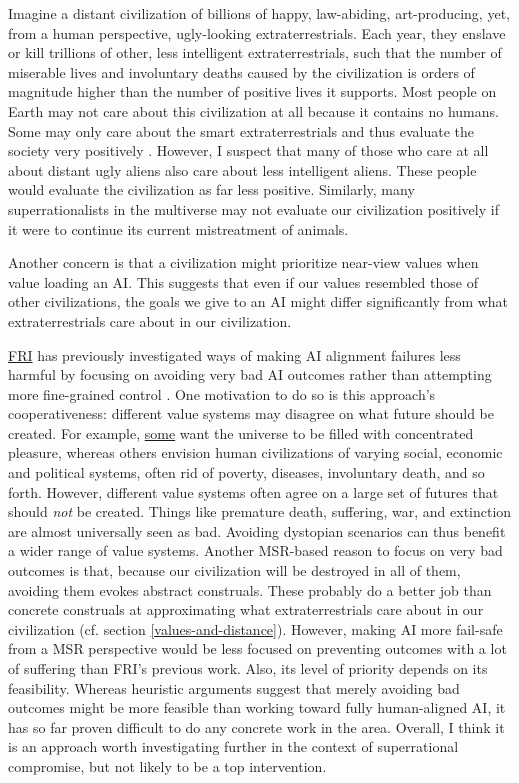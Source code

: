 Imagine a distant civilization of billions of happy, law-abiding,
art-producing, yet, from a human perspective, ugly-looking
extraterrestrials. Each year, they enslave or kill trillions of other,
less intelligent extraterrestrials, such that the number of miserable
lives and involuntary deaths caused by the civilization is orders of
magnitude higher than the number of positive lives it supports. Most
people on Earth may not care about this civilization at all because it
contains no humans. Some may only care about the smart extraterrestrials
and thus evaluate the society very positively
\parencite{Kagan2016-gc}. However, I suspect that many of
those who care at all about distant ugly aliens also care about less
intelligent aliens. These people would evaluate the civilization as far
less positive. Similarly, many superrationalists in the multiverse may
not evaluate our civilization positively if it were to continue its
current mistreatment of animals.

Another concern is that a civilization might prioritize near-view values
when value loading an AI. This suggests that even if our values
resembled those of other civilizations, the goals we give to an AI might
differ significantly from what extraterrestrials care about in our
civilization.

\href{https://foundational-research.org}{FRI} has previously investigated ways of making AI
alignment failures less harmful by focusing on avoiding very bad AI outcomes rather than
attempting more fine-grained control
\parencite{Gloor2016-oy}. One motivation to do so is this
approach's cooperativeness: different value systems may disagree on what
future should be created. For example,
\href{https://www.hedweb.com/hedab.htm}{some} want the universe
to be filled with concentrated pleasure, whereas others envision human
civilizations of varying social, economic and political systems, often
rid of poverty, diseases, involuntary death, and so forth. However,
different value systems often agree on a large set of futures that
should \emph{not} be created. Things like premature death, suffering,
war, and extinction are almost universally seen as bad. Avoiding
dystopian scenarios can thus benefit a wider range of value systems.
Another MSR-based reason to focus on very bad outcomes is that, because
our civilization will be destroyed in all of them, avoiding them evokes
abstract construals. These probably do a better job than concrete
construals at approximating what extraterrestrials care about in our
civilization (cf. section
\ref{values-and-distance}). However, making AI more fail-safe from a MSR perspective
would be less focused on preventing outcomes with a lot of suffering
than FRI's previous work. Also, its level of priority depends on its
feasibility. Whereas heuristic arguments suggest that merely avoiding
bad outcomes might be more feasible than working toward fully
human-aligned AI, it has so far proven difficult to do any concrete work
in the area. Overall, I think it is an approach worth investigating
further in the context of superrational compromise, but not likely to be
a top intervention.

